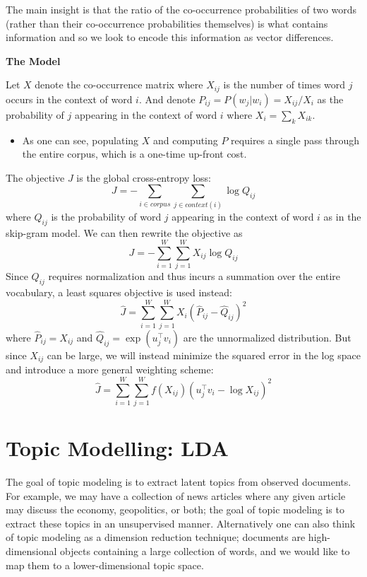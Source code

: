 \documentclass[
]{book}
\providecommand{\tightlist}{%
  \setlength{\itemsep}{0pt}\setlength{\parskip}{0pt}}
\begin{document}
The main insight is that the ratio of the co-occurrence probabilities of two words (rather than their co-occurrence probabilities themselves) is what contains information and so we look to encode this information as vector differences.

\textbf{The Model}

Let \(X\) denote the co-occurrence matrix where \(X_{ij}\) is the number of times word \(j\) occurs in the context of word \(i\). And denote \(P_{ij} = P(w_j | w_i) = X_{ij} / X_i\) as the probability of \(j\) appearing in the context of word \(i\) where \(X_i = \sum_{k} X_{ik}\).

\begin{itemize}
\tightlist
\item
  As one can see, populating \(X\) and computing \(P\) requires a single pass through the entire corpus, which is a one-time up-front cost.
\end{itemize}

The objective \(J\) is the global cross-entropy loss:
\[
J = - \sum_{i\in corpus} \sum_{j\in context(i)} \log Q_{ij}
\]
where \(Q_{ij}\) is the probability of word \(j\) appearing in the context of word \(i\) as in the skip-gram model. We can then rewrite the objective as
\[
J= - \sum_{i=1}^W \sum_{j=1}^W X_{ij} \log Q_{ij}
\]
Since \(Q_{ij}\) requires normalization and thus incurs a summation over the entire vocabulary, a least squares objective is used instead:
\[
\hat{J} = \sum_{i=1}^W \sum_{j=1}^W X_i (\hat{P}_{ij} - \hat{Q}_{ij})^2
\]
where \(\hat{P}_{ij} = X_{ij}\) and \(\hat{Q}_{ij} = \exp(u_j^\top v_i)\) are the unnormalized distribution. But since \(X_{ij}\) can be large, we will instead minimize the squared error in the log space and introduce a more general weighting scheme:
\[
\hat{J} = \sum_{i=1}^W \sum_{j=1}^W f(X_{ij}) (u_j^\top v_i - \log X_{ij})^2
\]

\hypertarget{topic-modelling-lda}{%
\chapter{Topic Modelling: LDA}\label{topic-modelling-lda}}

The goal of topic modeling is to extract latent topics from observed documents. For example, we may have a collection of news articles where any given article may discuss the economy, geopolitics, or both; the goal of topic modeling is to extract these topics in an unsupervised manner. Alternatively one can also think of topic modeling as a dimension reduction technique; documents are high-dimensional objects containing a large collection of words, and we would like to map them to a lower-dimensional topic space.
\end{document}
